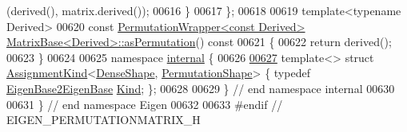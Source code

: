 \begin{DoxyCode}
      (derived(), matrix.derived());
00616     \}
00617 \};
00618 
00619 \textcolor{keyword}{template}<\textcolor{keyword}{typename} Derived>
00620 \textcolor{keyword}{const} \hyperlink{group___core___module_class_eigen_1_1_permutation_wrapper}{PermutationWrapper<const Derived>} 
      \hyperlink{group___core___module_class_eigen_1_1_matrix_base}{MatrixBase<Derived>::asPermutation}()\textcolor{keyword}{ const}
00621 \textcolor{keyword}{}\{
00622   \textcolor{keywordflow}{return} derived();
00623 \}
00624 
00625 \textcolor{keyword}{namespace }\hyperlink{namespaceinternal}{internal} \{
00626 
\hyperlink{struct_eigen_1_1internal_1_1_assignment_kind_3_01_dense_shape_00_01_permutation_shape_01_4}{00627} \textcolor{keyword}{template}<> \textcolor{keyword}{struct }\hyperlink{struct_eigen_1_1internal_1_1_assignment_kind}{AssignmentKind}<\hyperlink{struct_eigen_1_1_dense_shape}{DenseShape},
      \hyperlink{struct_eigen_1_1_permutation_shape}{PermutationShape}> \{ \textcolor{keyword}{typedef} \hyperlink{struct_eigen_1_1internal_1_1_eigen_base2_eigen_base}{EigenBase2EigenBase} 
      \hyperlink{struct_eigen_1_1internal_1_1_eigen_base2_eigen_base}{Kind}; \};
00628 
00629 \} \textcolor{comment}{// end namespace internal}
00630 
00631 \} \textcolor{comment}{// end namespace Eigen}
00632 
00633 \textcolor{preprocessor}{#endif // EIGEN\_PERMUTATIONMATRIX\_H}
\end{DoxyCode}
